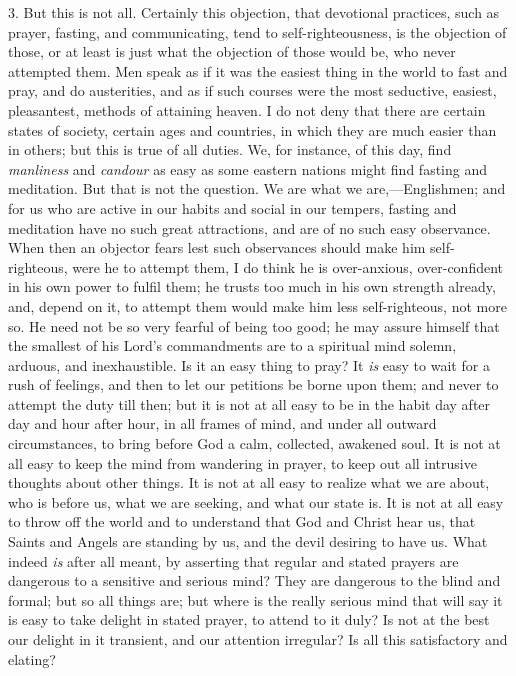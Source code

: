 3. But this is not all. Certainly this objection, that devotional
practices, such as prayer, fasting, and communicating, tend to
self-righteousness, is the objection of those, or at least is just
what the objection of those would be, who never attempted them. Men
speak as if it was the easiest thing in the world to fast and pray,
and do austerities, and as if such courses were the most seductive,
easiest, pleasantest, methods of attaining heaven. I do not deny that
there are certain states of society, certain ages and countries, in
which they are much easier than in others; but this is true of all
duties. We, for instance, of this day, find \emph{manliness} and \emph{candour}
as easy as some eastern nations might find fasting and meditation. But
that is not the question. We are what we are,—Englishmen; and for us
who are active in our habits and social in our tempers, fasting and
meditation have no such great attractions, and are of no such easy
observance. When then an objector fears lest such observances should
make him self-righteous, were he to attempt them, I do think he is
over-anxious, over-confident in his own power to fulfil them; he
trusts too much in his own strength already, and, depend on it, to
attempt them would make him less self-righteous, not more so. He need
not be so very fearful of being too good; he may assure himself that
the smallest of his Lord's commandments are to a spiritual mind
solemn, arduous, and inexhaustible. Is it an easy thing to pray? It \emph{is}
easy to wait for a rush of feelings, and then to let our petitions be
borne upon them; and never to attempt the duty till then; but it is
not at all easy to be in the habit day after day and hour after hour,
in all frames of mind, and under all outward circumstances, to bring
before God a calm, collected, awakened soul. It is not at all easy to
keep the mind from wandering in prayer, to keep out all intrusive
thoughts about other things. It is not at all easy to realize what we
are about, who is before us, what we are seeking, and what our state
is. It is not at all easy to throw off the world and to understand
that God and Christ hear us, that Saints and Angels are standing by
us, and the devil desiring to have us. What indeed \emph{is} after all
meant, by asserting that regular and stated prayers are dangerous to a
sensitive and serious mind? They are dangerous to the blind and
formal; but so all things are; but where is the really serious mind
that will say it is easy to take delight in stated prayer, to attend
to it duly? Is not at the best our delight in it transient, and our
attention irregular? Is all this satisfactory and elating?

